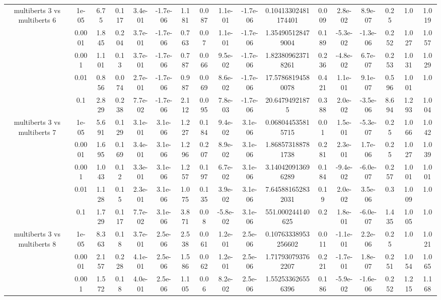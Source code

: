 \begin{tabular}{|c|c|c|c|c|c|c|c|c|c|c|c|c|c|c|c|c|}
\hline
\multirow{5}{*}{multiberts 3 vs multiberts 6} & 1e-05 & 6.75 & 0.117 & 3.4e-01 & -1.7e-06 & 1.181 & 0.087 & 1.1e-01 & -1.7e-06 & 0.10413302481174401 & 0.009 & 2.8e-02 & 8.9e-07 & 0.25 & 1.0 & 1.019 \\
 & 0.0001 & 1.845 & 0.204 & 3.7e-01 & -1.7e-06 & 0.763 & 0.07 & 1.1e-01 & -1.7e-06 & 1.354905128479004 & 0.189 & -5.3e-02 & -1.3e-06 & 0.252 & 1.027 & 1.057 \\
 & 0.001 & 1.101 & 0.13 & 3.7e-01 & -1.7e-06 & 0.787 & 0.066 & 9.5e-02 & -1.7e-06 & 1.823809623718261 & 0.236 & -4.8e-02 & 6.7e-07 & 0.253 & 1.031 & 1.029 \\
 & 0.01 & 0.856 & 0.074 & 2.7e-01 & -1.7e-06 & 0.987 & 0.069 & 8.6e-02 & -1.7e-06 & 17.57868194580078 & 0.421 & 1.1e-01 & 9.1e-07 & 0.596 & 1.001 & 1.0 \\
 & 0.1 & 2.829 & 0.238 & 7.7e-02 & -1.7e-06 & 2.112 & 0.095 & 7.8e-03 & -1.7e-06 & 20.64794921875 & 0.388 & 2.0e-02 & -3.5e-06 & 8.694 & 1.293 & 1.004 \\
\hline
\multirow{5}{*}{multiberts 3 vs multiberts 7} & 1e-05 & 5.691 & 0.129 & 3.1e-01 & 3.1e-06 & 1.227 & 0.184 & 9.4e-02 & 3.1e-06 & 0.068044535815715 & 0.01 & 1.5e-01 & -5.3e-07 & 0.25 & 1.066 & 1.042 \\
 & 0.0001 & 1.695 & 0.169 & 3.4e-01 & 3.1e-06 & 1.296 & 0.207 & 8.9e-02 & 3.1e-06 & 1.868573188781738 & 0.281 & 2.3e-01 & 1.7e-06 & 0.25 & 1.027 & 1.039 \\
 & 0.001 & 1.043 & 0.12 & 3.3e-01 & 3.1e-06 & 1.257 & 0.197 & 6.7e-02 & 3.1e-06 & 3.140420913696289 & 0.184 & -9.4e-02 & -6.0e-07 & 0.257 & 1.001 & 1.001 \\
 & 0.01 & 1.128 & 0.15 & 2.3e-01 & 3.1e-06 & 1.075 & 0.135 & 3.9e-02 & 3.1e-06 & 7.645881652832031 & 0.19 & 2.0e-02 & 3.5e-06 & 0.3 & 1.009 & 1.0 \\
 & 0.1 & 1.729 & 0.117 & 7.7e-02 & 3.1e-06 & 3.871 & 0.08 & -5.8e-02 & 3.1e-06 & 551.000244140625 & 0.2 & 1.8e-01 & -6.0e-07 & 1.435 & 1.005 & 1.0 \\
\hline
\multirow{5}{*}{multiberts 3 vs multiberts 8} & 1e-05 & 8.363 & 0.18 & 3.7e-01 & 2.5e-06 & 2.538 & 0.061 & 1.2e-01 & 2.5e-06 & 0.10763338953256602 & 0.011 & -1.1e-01 & 2.2e-06 & 0.25 & 1.0 & 1.021 \\
 & 0.0001 & 2.157 & 0.228 & 4.1e-01 & 2.5e-06 & 1.586 & 0.062 & 1.2e-01 & 2.5e-06 & 1.717930793762207 & 0.221 & -1.7e-01 & 1.8e-07 & 0.251 & 1.054 & 1.065 \\
 & 0.001 & 1.572 & 0.18 & 4.0e-01 & 2.5e-06 & 1.105 & 0.06 & 8.2e-02 & 2.5e-06 & 1.552533626556396 & 0.186 & -5.9e-02 & -1.6e-06 & 0.252 & 1.215 & 1.168 \\

\end{tabular}
